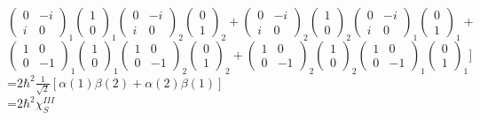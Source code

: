 \documentclass{article}
\begin{document}
\noindent $\begin{pmatrix}0 & -i \\ i & 0\end{pmatrix}_1\begin{pmatrix}1 \\ 0 \end{pmatrix}_1\begin{pmatrix}0 & -i \\ i & 0\end{pmatrix}_2\begin{pmatrix}0 \\ 1 \end{pmatrix}_2+\begin{pmatrix}0 & -i \\ i & 0\end{pmatrix}_2\begin{pmatrix}1 \\ 0 \end{pmatrix}_2\begin{pmatrix}0 & -i \\ i & 0\end{pmatrix}_1\begin{pmatrix}0 \\ 1 \end{pmatrix}_1+$\\
\noindent $\begin{pmatrix}1 & 0 \\ 0 & -1\end{pmatrix}_1\begin{pmatrix}1 \\ 0 \end{pmatrix}_1\begin{pmatrix}1 & 0 \\ 0 & -1\end{pmatrix}_2\begin{pmatrix}0 \\ 1 \end{pmatrix}_2+\begin{pmatrix}1 & 0 \\ 0 & -1\end{pmatrix}_2\begin{pmatrix}1 \\ 0 \end{pmatrix}_2\begin{pmatrix}1 & 0 \\ 0 & -1\end{pmatrix}_1\begin{pmatrix}0 \\ 1 \end{pmatrix}_1]$\\
\noindent =$2\hbar^2\frac{1}{\sqrt{2}}[\alpha(1)\beta(2)+\alpha(2)\beta(1)]$\\
\noindent =$2\hbar^2\chi^{III}_S$
\end{document}
